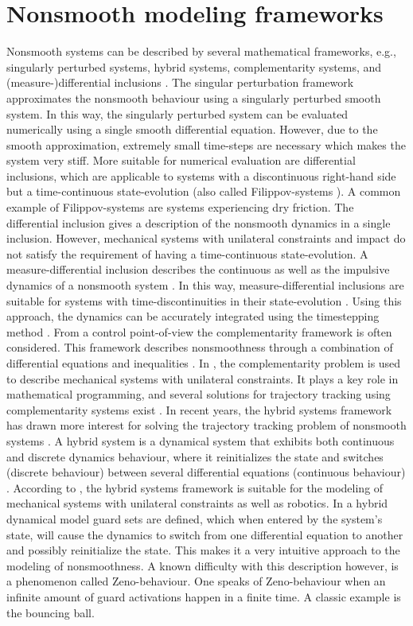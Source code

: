 \documentclass[../DC2017114Bouma.tex]{subfiles}
\begin{document}
\section{Nonsmooth modeling frameworks}
Nonsmooth systems can be described by several mathematical frameworks, e.g., singularly perturbed systems, hybrid systems, complementarity systems, and (measure-)differential inclusions \cite{Leine2004}. The singular perturbation framework approximates the nonsmooth behaviour using a singularly perturbed smooth system. In this way, the singularly perturbed system can be evaluated numerically using a single smooth differential equation. However, due to the smooth approximation, extremely small time-steps are necessary which makes the system very stiff. More suitable for numerical evaluation are differential inclusions, which are applicable to systems with a discontinuous right-hand side but a time-continuous state-evolution (also called Filippov-systems \cite{Filippov1988}). A common example of Filippov-systems are systems experiencing dry friction. The differential inclusion gives a description of the nonsmooth dynamics in a single inclusion. However, mechanical systems with unilateral constraints and impact do not satisfy the requirement of having a time-continuous state-evolution. A measure-differential inclusion describes the continuous as well as the impulsive dynamics of a nonsmooth system \cite{Leine2008b}. In this way, measure-differential inclusions are suitable for systems with time-discontinuities in their state-evolution \cite{Moreau1988,Brogliato1999}. Using this approach, the dynamics can be accurately integrated using the timestepping method \cite{Wouwa}. From a control point-of-view the complementarity framework is often considered. This framework describes nonsmoothness through a combination of differential equations and inequalities \cite{VanDerSchaft1998,Heemels1999}. In \cite{Glocker2001}, the complementarity problem is used to describe mechanical systems with unilateral constraints. It plays a key role in mathematical programming, and several solutions for trajectory tracking using complementarity systems exist \cite{Bourgeot2005,Morarescu2010}. In recent years, the hybrid systems framework has drawn more interest for solving the trajectory tracking problem of nonsmooth systems \cite{Hyun2014,Morris2009}. A hybrid system is a dynamical system that exhibits both continuous and discrete dynamics behaviour, where it reinitializes the state and switches (discrete behaviour) between several differential equations (continuous behaviour) \cite{Goebel2009}. According to \cite{Ding2011a}, the hybrid systems framework is suitable for the modeling of mechanical systems with unilateral constraints as well as robotics. In a hybrid dynamical model guard sets are defined, which when entered by the system's state, will cause the dynamics to switch from one differential equation to another and possibly reinitialize the state. This makes it a very intuitive approach to the modeling of nonsmoothness. A known difficulty with this description however, is a phenomenon called Zeno-behaviour. One speaks of Zeno-behaviour when an infinite amount of guard activations happen in a finite time. A classic example is the bouncing ball. 
\end{document}
